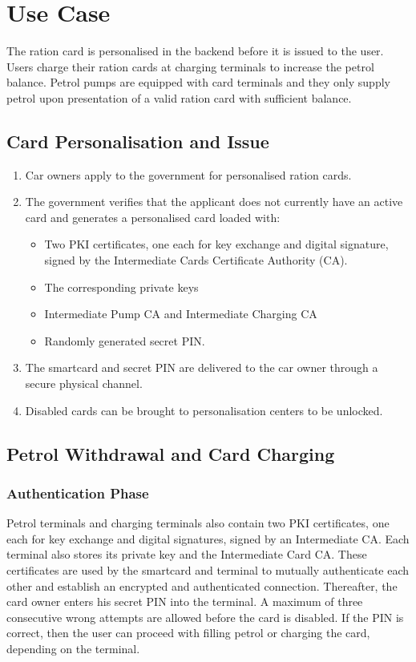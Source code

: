 \documentclass[a4paper,10pt]{llncs}
\begin{document}
\section{Use Case}
The ration card is personalised in the backend before it is issued to the user. Users charge their ration cards at charging terminals to increase the petrol balance. Petrol pumps are equipped with card terminals and they only supply petrol upon presentation of a valid ration card with sufficient balance.

\subsection{Card Personalisation and Issue}
\label{personalisation}
\begin{enumerate}
  \item Car owners apply to the government for personalised ration cards.
  \item The government verifies that the applicant does not currently have an active card and generates a personalised card loaded with: 
	\begin{itemize}
	  \item Two PKI certificates, one each for key exchange and digital signature, signed by the Intermediate Cards Certificate Authority (CA).
	  \item The corresponding private keys
	  \item Intermediate Pump CA and Intermediate Charging CA
	  \item Randomly generated secret PIN.
	\end{itemize}
  \item The smartcard and secret PIN are delivered to the car owner through a secure physical channel.
  \item Disabled cards can be brought to personalisation centers to be unlocked.
\end{enumerate}

\subsection{Petrol Withdrawal and Card Charging}
\subsubsection{Authentication Phase}
Petrol terminals and charging terminals also contain two PKI certificates, one each for key exchange and digital signatures, signed by an Intermediate CA. Each terminal also stores its private key and the Intermediate Card CA. These certificates are used by the smartcard and terminal to mutually authenticate each other and establish an encrypted and authenticated connection. Thereafter, the card owner enters his secret PIN into the terminal. A maximum of three consecutive wrong attempts are allowed before the card is disabled. If the PIN is correct, then the user can proceed with filling petrol or charging the card, depending on the terminal.
\end{document}
